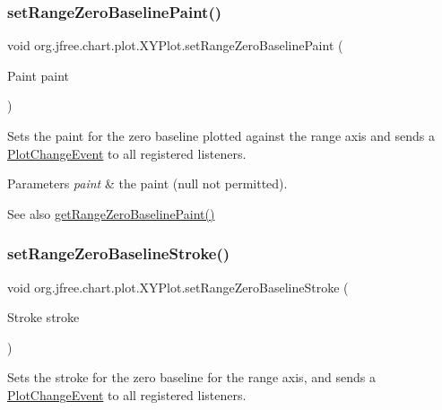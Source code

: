 \subsubsection{\texorpdfstring{set\+Range\+Zero\+Baseline\+Paint()}{setRangeZeroBaselinePaint()}}
{\footnotesize\ttfamily void org.\+jfree.\+chart.\+plot.\+X\+Y\+Plot.\+set\+Range\+Zero\+Baseline\+Paint (\begin{DoxyParamCaption}\item[{Paint}]{paint }\end{DoxyParamCaption})}

Sets the paint for the zero baseline plotted against the range axis and sends a \mbox{\hyperlink{}{Plot\+Change\+Event}} to all registered listeners.


\begin{DoxyParams}{Parameters}
{\em paint} & the paint ({\ttfamily null} not permitted).\\
\hline
\end{DoxyParams}
\begin{DoxySeeAlso}{See also}
\mbox{\hyperlink{classorg_1_1jfree_1_1chart_1_1plot_1_1_x_y_plot_ae0e06c4efef9b49e9c8e945f1451a991}{get\+Range\+Zero\+Baseline\+Paint()}} 
\end{DoxySeeAlso}
\mbox{\label{classorg_1_1jfree_1_1chart_1_1plot_1_1_x_y_plot_ad6e0bfc216bd1280fac3de9cb311f13e}} 
\subsubsection{\texorpdfstring{set\+Range\+Zero\+Baseline\+Stroke()}{setRangeZeroBaselineStroke()}}
{\footnotesize\ttfamily void org.\+jfree.\+chart.\+plot.\+X\+Y\+Plot.\+set\+Range\+Zero\+Baseline\+Stroke (\begin{DoxyParamCaption}\item[{Stroke}]{stroke }\end{DoxyParamCaption})}

Sets the stroke for the zero baseline for the range axis, and sends a \mbox{\hyperlink{}{Plot\+Change\+Event}} to all registered listeners.


